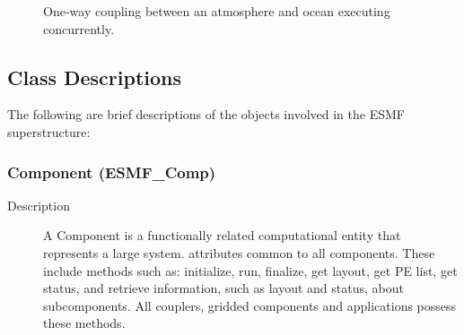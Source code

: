 \begin{figure}
\label{fig:1waycoupling}
\caption[{Coupling Sequence}]{One-way coupling between an atmosphere and
ocean executing concurrently.}
\end{figure}

\subsection{Class Descriptions}

The following are brief descriptions of the objects involved in the
ESMF superstructure:

\subsubsection{Component (ESMF\_Comp)} 
\begin{description}
\item [Description] A Component is a functionally related computational entity that represents 
a large system.  
attributes common to all components.  These include methods such as:
initialize, run, finalize, get layout, get PE list, get status, and 
retrieve information, such as layout and status, about subcomponents.  
All couplers, gridded components and applications possess these methods. 
\end{description}

